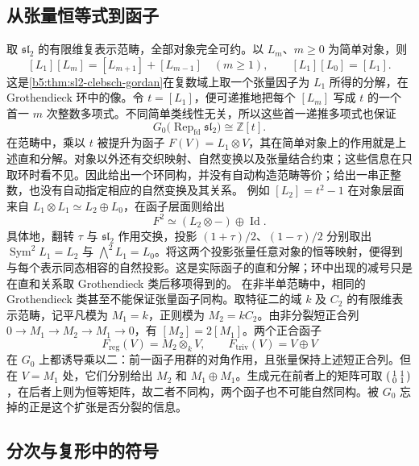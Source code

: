 \subsection{从张量恒等式到函子}
\label{b5:subsec:B03:02}

取 \(\mathfrak{sl}_2\) 的有限维复表示范畴，全部对象完全可约。以 \(L_m\)、\(m\ge0\) 为简单对象，则
\[
	[L_1][L_m]=[L_{m+1}]+[L_{m-1}] \quad(m\ge1),\qquad [L_1][L_0]=[L_1].
\]
这是\cref{b5:thm:sl2-clebsch-gordan}在复数域上取一个张量因子为 \(L_1\) 所得的分解，在 Grothendieck 环中的像。令 \(t=[L_1]\)，便可递推地把每个 \([L_m]\) 写成 \(t\) 的一个首一 \(m\) 次整数多项式。不同简单类线性无关，所以这些首一递推多项式也保证
\[
	G_0\bigl(\operatorname{Rep}_{\mathrm{fd}}\mathfrak{sl}_2\bigr) \cong\mathbb Z[t].
\]
在范畴中，乘以 \(t\) 被提升为函子 \(F(V)=L_1\otimes V\)，其在简单对象上的作用就是上述直和分解。对象以外还有交织映射、自然变换以及张量结合约束；这些信息在只取环时看不见。因此给出一个环同构，并没有自动构造范畴等价；给出一串正整数，也没有自动指定相应的自然变换及其关系。
\ProseParagraphBreak
例如 \([L_2]=t^2-1\) 在对象层面来自 \(L_1\otimes L_1\simeq L_2\oplus L_0\)，在函子层面则给出
\[
	F^2\simeq (L_2\otimes-)\oplus\operatorname{Id}.
\]
具体地，翻转 \(\tau\) 与 \(\mathfrak{sl}_2\) 作用交换，投影 \((1+\tau)/2\)、\((1-\tau)/2\) 分别取出 \(\operatorname{Sym}^2L_1=L_2\) 与 \(\bigwedge^2L_1=L_0\)。将这两个投影张量任意对象的恒等映射，便得到与每个表示同态相容的自然投影。这是实际函子的直和分解；环中出现的减号只是在直和关系取 Grothendieck 类后移项得到的。
\ProseParagraphBreak
在非半单范畴中，相同的 Grothendieck 类甚至不能保证张量函子同构。取特征二的域 \(k\) 及 \(C_2\) 的有限维表示范畴，记平凡模为 \(M_1=k\)，正则模为 \(M_2=kC_2\)。由非分裂短正合列 \(0\to M_1\to M_2\to M_1\to0\)，有 \([M_2]=2[M_1]\)。两个正合函子
\[
	F_{\mathrm{reg}}(V)=M_2\otimes_k V,\qquad F_{\mathrm{triv}}(V)=V\oplus V
\]
在 \(G_0\) 上都诱导乘以二：前一函子用群的对角作用，且张量保持上述短正合列。但在 \(V=M_1\) 处，它们分别给出 \(M_2\) 和 \(M_1\oplus M_1\)。生成元在前者上的矩阵可取 \(\begin{psmallmatrix}1&1\\0&1\end{psmallmatrix}\)，在后者上则为恒等矩阵，故二者不同构，两个函子也不可能自然同构。被 \(G_0\) 忘掉的正是这个扩张是否分裂的信息。

\subsection{分次与复形中的符号}
\label{b5:subsec:B03:03}

